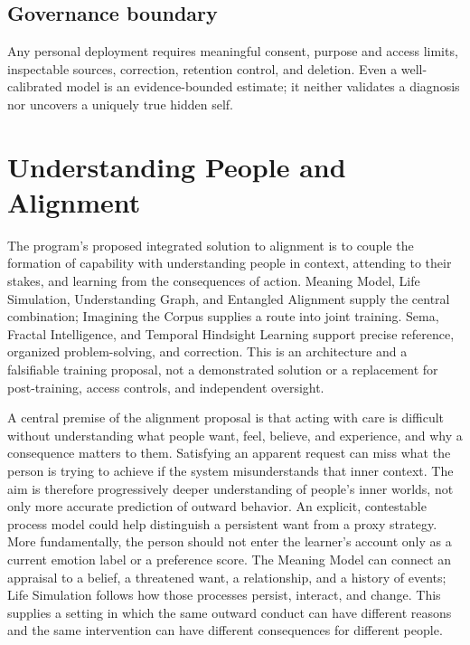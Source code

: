 \documentclass[10pt]{article}
\begin{document}
\subsection{Governance boundary}

Any personal deployment requires meaningful consent, purpose and access limits,
inspectable sources, correction, retention control, and deletion. Even a
well-calibrated model is an evidence-bounded estimate; it neither validates a
diagnosis nor uncovers a uniquely true hidden self.

\section{Understanding People and Alignment}
\label{sec:alignment}

The program's proposed integrated solution to alignment is to couple the
formation of capability with understanding people in context, attending to
their stakes, and learning from the consequences of action. Meaning Model,
Life Simulation, Understanding Graph, and Entangled Alignment supply the
central combination; Imagining the Corpus supplies a route into joint
training. Sema, Fractal Intelligence, and Temporal Hindsight Learning support
precise reference, organized problem-solving, and correction. This is an
architecture and a falsifiable training proposal, not a demonstrated solution
or a replacement for post-training, access controls, and independent oversight.

A central premise of the alignment proposal is that acting with care is
difficult without understanding what people want, feel, believe, and experience,
and why a consequence matters to them. Satisfying an apparent request can miss
what the person is trying to achieve if the system misunderstands that inner
context. The aim is therefore progressively deeper understanding of people's
inner worlds, not only more accurate prediction of outward behavior.
An explicit, contestable process model could help distinguish a persistent
want from a proxy strategy. More fundamentally, the person should not enter
the learner's account only as a current emotion label or a preference score.
The Meaning Model can connect an appraisal to a belief, a threatened want, a
relationship, and a history of events; Life Simulation follows how those
processes persist, interact, and change. This supplies a setting in which the
same outward conduct can have different reasons and the same intervention can
have different consequences for different people.
\end{document}
